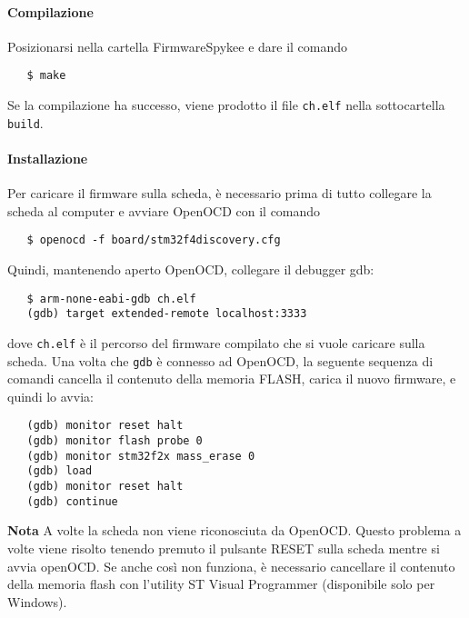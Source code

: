 \paragraph{Compilazione} Posizionarsi nella cartella FirmwareSpykee e dare il comando
\begin{verbatim}
   $ make
\end{verbatim}
Se la compilazione ha successo, viene prodotto il file \verb|ch.elf| nella sottocartella \verb|build|.

\paragraph{Installazione} Per caricare il firmware sulla scheda, è necessario prima di tutto collegare la scheda al computer e avviare OpenOCD con il comando
\begin{verbatim}
   $ openocd -f board/stm32f4discovery.cfg
\end{verbatim}
Quindi, mantenendo aperto OpenOCD, collegare il debugger gdb:
\begin{verbatim}
   $ arm-none-eabi-gdb ch.elf
   (gdb) target extended-remote localhost:3333
\end{verbatim}
dove \verb|ch.elf| è il percorso del firmware compilato che si vuole caricare sulla scheda. Una volta che \verb|gdb| è connesso ad OpenOCD, la seguente sequenza di comandi cancella il contenuto della memoria FLASH, carica il nuovo firmware, e quindi lo avvia:
\begin{verbatim}
   (gdb) monitor reset halt
   (gdb) monitor flash probe 0 
   (gdb) monitor stm32f2x mass_erase 0 
   (gdb) load 
   (gdb) monitor reset halt 
   (gdb) continue
\end{verbatim}

\textbf{Nota } A volte la scheda non viene riconosciuta da OpenOCD. Questo problema a volte viene risolto tenendo premuto il pulsante RESET sulla scheda mentre si avvia openOCD. Se anche così non funziona, è necessario cancellare il contenuto della memoria flash con l’utility ST Visual Programmer (disponibile solo per Windows).

